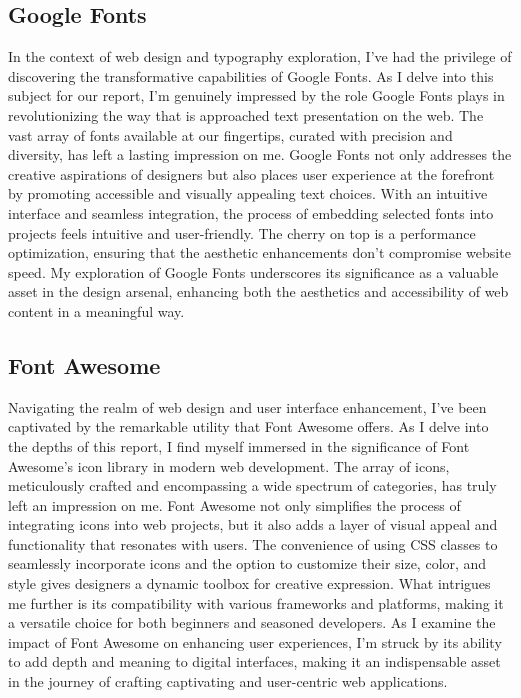 \subsection{Google Fonts}
In the context of web design and typography exploration, I've had the privilege of discovering the transformative capabilities of Google Fonts. As I delve into this subject for our report, I'm genuinely impressed by the role Google Fonts plays in revolutionizing the way that is approached text presentation on the web. The vast array of fonts available at our fingertips, curated with precision and diversity, has left a lasting impression on me. Google Fonts not only addresses the creative aspirations of designers but also places user experience at the forefront by promoting accessible and visually appealing text choices. With an intuitive interface and seamless integration, the process of embedding selected fonts into projects feels intuitive and user-friendly. The cherry on top is a performance optimization, ensuring that the aesthetic enhancements don't compromise website speed. My exploration of Google Fonts underscores its significance as a valuable asset in the design arsenal, enhancing both the aesthetics and accessibility of web content in a meaningful way.
\subsection{Font Awesome }
Navigating the realm of web design and user interface enhancement, I've been captivated by the remarkable utility that Font Awesome offers. As I delve into the depths of this report, I find myself immersed in the significance of Font Awesome's icon library in modern web development. The array of icons, meticulously crafted and encompassing a wide spectrum of categories, has truly left an impression on me. Font Awesome not only simplifies the process of integrating icons into web projects, but it also adds a layer of visual appeal and functionality that resonates with users. The convenience of using CSS classes to seamlessly incorporate icons and the option to customize their size, color, and style gives designers a dynamic toolbox for creative expression. What intrigues me further is its compatibility with various frameworks and platforms, making it a versatile choice for both beginners and seasoned developers. As I examine the impact of Font Awesome on enhancing user experiences, I'm struck by its ability to add depth and meaning to digital interfaces, making it an indispensable asset in the journey of crafting captivating and user-centric web applications.

